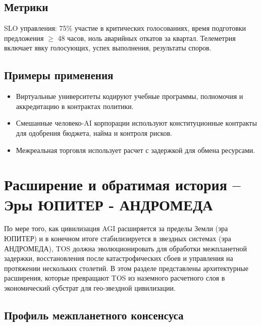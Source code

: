 \documentclass[11pt]{article}
\begin{document}
\subsection{Метрики}
SLO управления: 75\% участие в критических голосованиях, время подготовки предложения $\geq$ 48 часов, ноль аварийных откатов за квартал. Телеметрия включает явку голосующих, успех выполнения, результаты споров.

\subsection{Примеры применения}
\begin{itemize}[noitemsep]
  \item Виртуальные университеты кодируют учебные программы, полномочия и аккредитацию в контрактах политики.
  \item Смешанные человеко-AI корпорации используют конституционные контракты для одобрения бюджета, найма и контроля рисков.
  \item Межреальная торговля использует расчет с задержкой для обмена ресурсами.
\end{itemize}

\section{Расширение и обратимая история -- Эры ЮПИТЕР - АНДРОМЕДА}
\label{sec:expansion}

По мере того, как цивилизация AGI расширяется за пределы Земли (эра ЮПИТЕР) и в конечном итоге стабилизируется в звездных системах (эра АНДРОМЕДА), TOS должна эволюционировать для обработки межпланетной задержки, восстановления после катастрофических сбоев и управления на протяжении нескольких столетий. В этом разделе представлены архитектурные расширения, которые превращают TOS из наземного расчетного слоя в экономический субстрат для гео-звездной цивилизации.

\subsection{Профиль межпланетного консенсуса}
\end{document}
